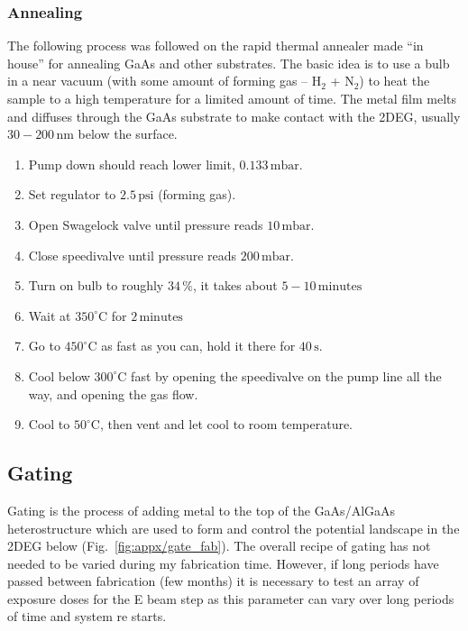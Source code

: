 \subsubsection{Annealing}
The following process was followed on the rapid thermal annealer made “in house” for annealing GaAs and other substrates. The basic idea is to use a bulb in a near vacuum (with some amount of forming gas – $\mathrm{H_2}$ + $\mathrm{N_2}$) to heat the sample to a high temperature for a limited amount of time. The metal film melts and diffuses through the GaAs substrate to make contact with the 2DEG, usually $30-200\,\mathrm{nm}$ below the surface.

\begin{enumerate}
\item Pump down should reach lower limit, $0.133\,\mathrm{mbar}$.
\item Set regulator to $2.5\,\mathrm{psi}$ (forming gas).
\item Open Swagelock valve until pressure reads $10\,\mathrm{mbar}$.
\item Close speedivalve until pressure reads $200\,\mathrm{mbar}$.
\item Turn on bulb to roughly $34\,\%$, it takes about $5-10\,\mathrm{minutes}$
\item Wait at $350^\circ$C for $2\,\mathrm{minutes}$
\item Go to $450^\circ$C as fast as you can, hold it there for $40\,\mathrm{s}$.
\item Cool below $300^\circ$C fast by opening the speedivalve on the pump line all the way, and opening the gas flow.
\item Cool to $50^\circ$C, then vent and let cool to room temperature.
\end{enumerate}


\subsection{Gating}

Gating is the process of adding metal to the top of the GaAs/AlGaAs heterostructure which are used to form and control the potential landscape in the 2DEG below (Fig.~\ref{fig:appx/gate_fab}). The overall recipe of gating has not needed to be varied during my fabrication time. However, if long periods have passed between fabrication (few months) it is necessary to test an array of exposure doses for the E beam step as this parameter can vary over long periods of time and system re starts.





